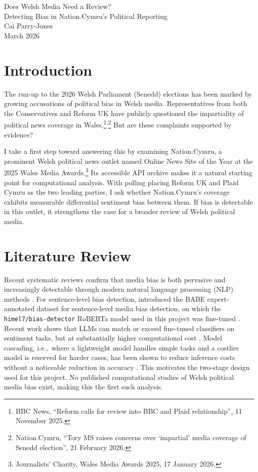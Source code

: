 \documentclass[10pt]{article}
\begin{document}
\thispagestyle{fancy}
\vspace{0.8em}
\begin{center}
{\fontsize{13}{16}\selectfont Does Welsh Media Need a Review?\\[4pt]Detecting Bias in Nation.Cymru's Political Reporting}\\[6pt]
{\small Cai Parry-Jones\\March 2026}
\end{center}
\vspace{0.8em}

\section{Introduction}

The run-up to the 2026 Welsh Parliament (Senedd) elections has been marked by growing accusations of political bias in Welsh media. Representatives from both the Conservatives and Reform UK have publicly questioned the impartiality of political news coverage in Wales.\footnote{BBC News, ``Reform calls for review into BBC and Plaid relationship'', 11 November 2025.}\textsuperscript{,}\footnote{Nation.Cymru, ``Tory MS raises concerns over `impartial' media coverage of Senedd election'', 21 February 2026.} But are these complaints supported by evidence?

I take a first step toward answering this by examining Nation.Cymru, a prominent Welsh political news outlet named Online News Site of the Year at the 2025 Wales Media Awards.\footnote{Journalists' Charity, Wales Media Awards 2025, 17 January 2026.} Its accessible API archive makes it a natural starting point for computational analysis. With polling placing Reform UK and Plaid Cymru as the two leading parties, I ask whether Nation.Cymru's coverage exhibits measurable differential sentiment bias between them. If bias is detectable in this outlet, it strengthens the case for a broader review of Welsh political media.

\section{Literature Review}

Recent systematic reviews confirm that media bias is both pervasive and increasingly detectable through modern natural language processing (NLP) methods \citep{rodrigogines2024}. For sentence-level bias detection, \citet{spinde2021} introduced the BABE expert-annotated dataset for sentence-level media bias detection, on which the \texttt{himel7/bias-detector} RoBERTa model used in this project was fine-tuned \citep{ghosh2025}. Recent work shows that LLMs can match or exceed fine-tuned classifiers on sentiment tasks, but at substantially higher computational cost \citep{shao2025}. Model cascading, i.e.,\ where a lightweight model handles simple tasks and a costlier model is reserved for harder cases, has been shown to reduce inference costs without a noticeable reduction in accuracy \citep{yue2024}. This motivates the two-stage design used for this project. No published computational studies of Welsh political media bias exist, making this the first such analysis.
\end{document}
